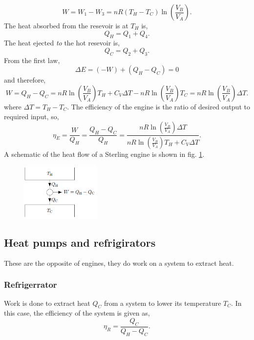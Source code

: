 \documentclass{book}
\begin{document}
\begin{equation}
	W = W_1 - W_3 = nR(T_H - T_C)\ln\left(\frac{V_B}{V_A}\right).
\end{equation}
The heat absorbed from the resevoir is at $T_H$ is,
\begin{equation}
	Q_H = Q_1 + Q_4.
\end{equation}
The heat ejected \textit{to} the hot resevoir is,
\begin{equation}
	Q_C = Q_2 + Q_3.
\end{equation}
From the first law,
\begin{equation}
	\Delta E = (-W) + (Q_H - Q_C) = 0
\end{equation}
and therefore,
\begin{equation}
	W = Q_H - Q_C = nR\ln\left(\frac{V_B}{V_A}\right)T_H + C_V\Delta T - nR\ln\left(\frac{V_B}{V_A}\right)T_C = nR\ln\left(\frac{V_B}{V_A}\right)\Delta T.
\end{equation}
where $\Delta T = T_H - T_C$. The efficiency of the engine is the ratio of desired output to required input, so,
\begin{equation}
	\eta_E = \frac{W}{Q_H}  = \frac{Q_H - Q_C}{Q_H} = \frac{nR\ln\left(\frac{V_B}{V_A}\right)\Delta T}{nR\ln\left(\frac{V_B}{V_A}\right)T_H + C_V\Delta T}.
\end{equation}
A schematic of the heat flow of a Sterling engine is shown in fig. \ref{fig:sterlingengine}.
\begin{figure}
	\centering
	\includegraphics[width=150px]{sterlingengine.png}
	\caption{}\label{fig:sterlingengine}
\end{figure}
\subsection{Heat pumps and refrigirators}
These are the opposite of engines, they do work on a system to extract heat.
\subsubsection{Refrigerrator}
Work is done to extract heat $Q_C$ from a system to lower its temperature $T_C$. In this case, the efficiency of the system is given as,
\begin{equation}
	\eta_R = \frac{Q_C}{Q_H - Q_C}.
\end{equation}
\end{document}
